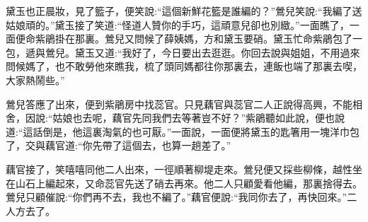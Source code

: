 \begin{parag}
    黛玉也正晨妝，見了籃子，便笑說:“這個新鮮花籃是誰編的？”鶯兒笑說:“我編了送姑娘頑的。”黛玉接了笑道:“怪道人贊你的手巧，這頑意兒卻也別緻。”一面瞧了，一面便命紫鵑掛在那裏。鶯兒又問候了薛姨媽，方和黛玉要硝。黛玉忙命紫鵑包了一包，遞與鶯兒。黛玉又道:“我好了，今日要出去逛逛。你回去說與姐姐，不用過來問候媽了，也不敢勞他來瞧我，梳了頭同媽都往你那裏去，連飯也端了那裏去喫，大家熱鬧些。”
\end{parag}


\begin{parag}
    鶯兒答應了出來，便到紫鵑房中找蕊官。只見藕官與蕊官二人正說得高興，不能相舍，因說:“姑娘也去呢，藕官先同我們去等著豈不好？”紫鵑聽如此說，便也說道:“這話倒是，他這裏淘氣的也可厭。”一面說，一面便將黛玉的匙箸用一塊洋巾包了，交與藕官道:“你先帶了這個去，也算一趟差了。”
\end{parag}


\begin{parag}
    藕官接了，笑嘻嘻同他二人出來，一徑順著柳堤走來。鶯兒便又採些柳條，越性坐在山石上編起來，又命蕊官先送了硝去再來。他二人只顧愛看他編，那裏捨得去。鶯兒只顧催說:“你們再不去，我也不編了。”藕官便說:“我同你去了，再快回來。”二人方去了。
\end{parag}


